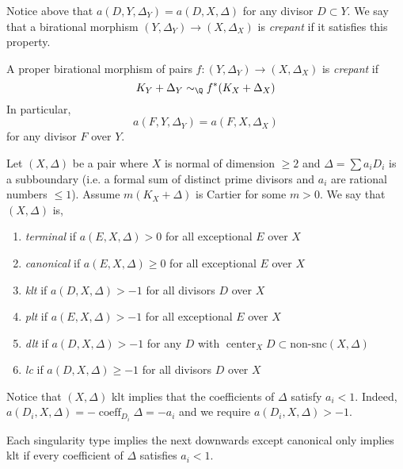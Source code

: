 \documentclass[12pt]{article}
\DeclareMathOperator{\coeff}{\mathrm{coeff}}
\DeclareMathOperator{\cent}{\mathrm{center}}
\begin{document}
\begin{rmk}
Notice above that $a(D, Y, \Delta_Y) = a(D, X, \Delta)$ for any divisor $D \subset Y$. We say that a birational morphism $(Y, \Delta_Y) \to (X, \Delta_X)$ is \textit{crepant} if it satisfies this property. 
\end{rmk}


\begin{defn}
A proper birational morphism of pairs $f : (Y, \Delta_Y) \to (X, \Delta_X)$ is \textit{crepant} if 
\[ K_Y + \Delta_Y \sim_{\Q} f^* (K_X + \Delta_X) \]
In particular,
\[ a(F, Y, \Delta_Y) = a(F, X, \Delta_X) \]
for any divisor $F$ over $Y$. 
\end{defn}


\begin{defn}
Let $(X, \Delta)$ be a pair where $X$ is normal of dimension $\ge 2$ and $\Delta = \sum a_i D_i$ is a subboundary (i.e. a formal sum of distinct prime divisors and $a_i$ are rational numbers $\le 1$). Assume $m(K_X + \Delta)$ is Cartier for some $m > 0$. We say that $(X, \Delta)$ is,
\begin{enumerate}
\item \textit{terminal} if $a(E, X, \Delta) > 0$ for all exceptional $E$ over $X$
\item \textit{canonical} if $a(E, X, \Delta) \ge 0$ for all exceptional $E$ over $X$
\item \textit{klt} if $a(D, X, \Delta) > -1$ for all divisors $D$ over $X$
\item \textit{plt} if $a(E, X, \Delta) > -1$ for all exceptional $E$ over $X$
\item \textit{dlt} if $a(D, X, \Delta) > -1$ for any $D$ with $\cent_X D \subset \text{non-snc}(X, \Delta)$
\item \textit{lc} if $a(D, X, \Delta) \ge -1$ for all divisors $D$ over $X$
\end{enumerate}
\end{defn}

\begin{rmk}
Notice that $(X, \Delta)$ klt implies that the coefficients of $\Delta$ satisfy $a_i < 1$. Indeed, $a(D_i, X, \Delta) = - \coeff_{D_i} \Delta = - a_i$ and we require $a(D_i, X, \Delta) > - 1$. 
\end{rmk}

\begin{rmk}
Each singularity type implies the next downwards except canonical only implies klt if every coefficient of $\Delta$ satisfies $a_i < 1$. 
\end{rmk}
\end{document}
